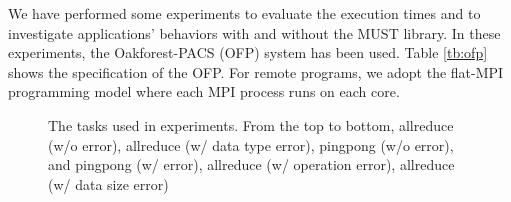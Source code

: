\documentclass[graybox]{svmult}
\begin{document}
We have performed some experiments to evaluate the execution times and to investigate applications' behaviors with and without the MUST library. 
In these experiments, the Oakforest-PACS (OFP) system has been used. Table \ref{tb:ofp} shows the specification of the OFP. For remote programs, we adopt the flat-MPI programming model where each MPI process runs on each core. 
 
\begin{figure}[t]
 \begin{center}
\caption{The tasks used in experiments. From the top to bottom, allreduce (w/o error), allreduce (w/ data type error), pingpong (w/o error), and pingpong (w/ error), allreduce (w/ operation error), allreduce (w/ data size error)}
  \label{fig:test-tasks}
 \end{center}
\end{figure}
\end{document}

